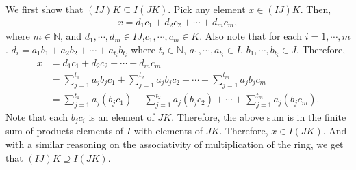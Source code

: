 \documentclass[12pt]{article}
\begin{document}
\begin{fproof}[Jacobson 2.5.2]
  We first show that \((IJ)K \subseteq I(JK)\).
  Pick any element \(x \in (IJ)K\).
  Then,
  \begin{align*}
    x = d_1c_1 + d_2c_2 + \cdots + d_{m}c_{m},
  \end{align*}
  where \(m \in \mathbb{N}\), and \(d_1, \cdots, d_{m} \in IJ\),\( c_1, \cdots, c_{m} \in K\).
  Also note that for each \(i = 1, \cdots, m\).
  \(d_i = a_1b_1 + a_2b_2 + \cdots + a_{t_i}b_{t_i}\) where \(t_i \in \mathbb{N}\), \(a_1, \cdots, a_{t_i} \in I\), \(b_1, \cdots, b_{t_i} \in J\).
  Therefore,
  \begin{align*}
    x &= d_1c_1 + d_2c_2 + \cdots + d_{m}c_{m}\\
    &= \sum_{j=1}^{t_1} a_jb_jc_1 + \sum_{j=1}^{t_2} a_jb_jc_2 + \cdots + \sum_{j=1}^{t_m} a_jb_jc_m\\
    &= \sum_{j=1}^{t_1} a_j(b_jc_1) + \sum_{j=1}^{t_2} a_j(b_jc_2) + \cdots + \sum_{j=1}^{t_m} a_j(b_jc_m).
  \end{align*}
  Note that each \(b_jc_i\) is an element of \(JK\).
  Therefore, the above sum is in the finite sum of products elements of \(I\) with elements of \(JK\).
  Therefore, \(x \in I(JK)\).
  And with a similar reasoning on the associativity of multiplication of the ring, we get that \((IJ)K \supseteq I(JK)\).
\end{fproof}
\newpage

\begin{fproof}[Jacobson 2.5.3]
    
\end{fproof}
\newpage

\begin{fproof}[Jacobson 2.6.4]

\end{fproof}
\newpage

\begin{fproof}[Jacobson 2.7.2]

\end{fproof}
\newpage
\end{document}
